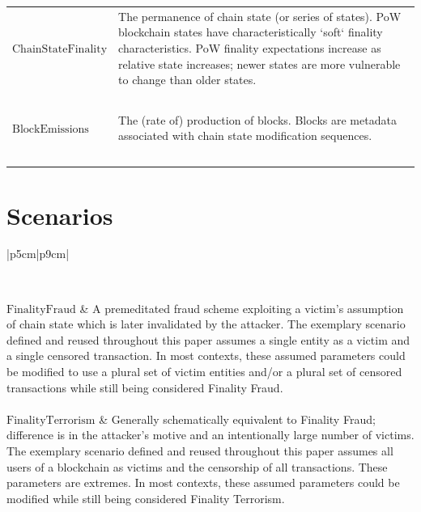 \documentclass[11pt]{article}
\theoremstyle{plain}
\begin{document}
\begin{table}[H]
{\begin{tabular}{|p{5cm}|p{9cm}|}
$\mathrm{Chain State Finality}$ & The permanence of chain state (or series of
states). PoW blockchain states have characteristically `soft` finality
characteristics. PoW finality expectations increase as relative state
increases; newer states are more vulnerable to change than older states. \\~\\

$\mathrm{Block Emissions}$ & The (rate of) production of blocks. Blocks are
metadata associated with chain state modification sequences. \\~\\

\hline
\end{tabular}
}
\end{table}


\section{\normalsize{Scenarios}}

\begin{table}[H]
\caption{Outlines of Referenced Chain State Scenarios \label{table: chainstate-scenarios}}
\centering
\small{
\begin{tabular}{|p{5cm}|p{9cm}|}

\hline
{} \\
\hline
\hline

$\mathrm{Finality Fraud}$ & A premeditated fraud scheme exploiting a victim's
assumption of chain state which is later invalidated by the attacker. The
exemplary scenario defined and reused throughout this paper assumes a single
entity as a victim and a single censored transaction. In most contexts, these
assumed parameters could be modified to use a plural set of victim entities
and/or a plural set of censored transactions while still being considered
Finality Fraud. \\~\\

$\mathrm{Finality Terrorism}$ & Generally schematically equivalent to Finality
Fraud; difference is in the attacker's motive and an intentionally large number
of victims. The exemplary scenario defined and reused throughout this paper
assumes all users of a blockchain as victims and the censorship of all
transactions. These parameters are extremes. In most contexts, these assumed
parameters could be modified while still being considered Finality Terrorism.
\\~\\

\hline
\end{tabular}
}
\end{table}
\end{document}
